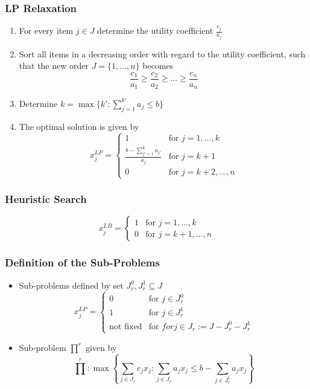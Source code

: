 \documentclass[11pt]{article}
\begin{document}
\subsubsection{LP Relaxation}
\begin{enumerate}[label=\roman*.]
	\item For every item  $j\in J$ determine the utility coefficient $\frac{c_j}{a_j}$
	\item Sort all items in a decreasing order with regard to the utility coefficient, such that the new order $J = \{1,...,n\}$ becomes
	\begin{equation*}
		\frac{c_1}{a_1}\geq\frac{c_2}{a_2}\geq\dots\geq\frac{c_n}{a_n}
	\end{equation*}
	\item Determine $k = \max\{k' : \sum_{j=1}^{k'}a_j \leq b\}$
	\item The optimal solution is given by
	\begin{equation*}
		x_j^{LP} = \left\{ \begin{matrix}
		1 & \text{for } j = 1,\dots, k\\
		\frac{b-\sum_{j' = 1}^{k} a_{j'}}{a_j} & \text{for } j = k + 1\\
		0 & \text{for } j = k + 2,\dots, n
		\end{matrix} \right.
	\end{equation*}
\end{enumerate}

\subsubsection{Heuristic Search}
	\begin{equation*}
		x_j^{LB} = \left\{ \begin{matrix}
			1 & \text{for } j = 1,\dots, k\\
			0 & \text{for } j = k + 1,\dots, n
		\end{matrix} \right.
\end{equation*}

\subsubsection{Definition of the Sub-Problems}
\begin{itemize}
	\item Sub-problems defined by set $J_r^0,J_r^1\subseteq J$
		\begin{equation*}
			x_j^{LP} = \left\{ \begin{matrix}
				0 & \text{for } j \in J_r^0\\
				1 & \text{for } j \in J_r^1\\
				\text{not fixed} & \text{for } for j\in J_r := J - J_r^0 - J_r^1
			\end{matrix} \right.
	\end{equation*}
	\item Sub-problem ${\prod}^r$ given by
	\begin{equation*}
		{\prod}^r : \max \left\{ \sum_{j\in J_r}c_j x_j : \sum_{j\in J_r}a_j x_j  \leq b - \sum_{j\in J_r^1}a_j x_j  \right\}
	\end{equation*}
\end{itemize}
\end{document}
